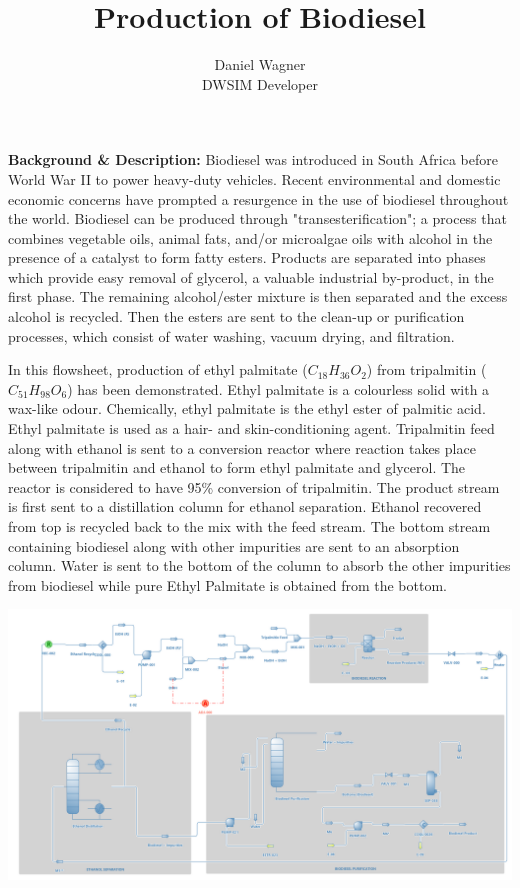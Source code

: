 \documentclass[a4paper,12pt]{article}
\title{Production of Biodiesel}
\author{Daniel Wagner \\ DWSIM Developer}
\date{}
\begin{document}
\maketitle

\noindent \textbf{Background \& Description:}
\newline Biodiesel was introduced in South Africa before World War II to power heavy-duty vehicles. Recent environmental and domestic economic concerns have prompted a resurgence in the use of biodiesel throughout the world. Biodiesel can be produced through "transesterification"; a process that combines vegetable oils, animal fats, and/or microalgae oils with alcohol in the presence of a catalyst to form fatty esters. Products are separated into phases which provide easy removal of glycerol, a valuable industrial by-product, in the first phase. The remaining alcohol/ester mixture is then separated and the excess alcohol is recycled. Then the esters are sent to the clean-up or purification processes, which consist of water washing, vacuum drying, and filtration. 

In this flowsheet, production of ethyl palmitate ($C_{18}H_{36}O_2$) from tripalmitin ($C_{51}H_{98}O_6$) has been demonstrated. Ethyl palmitate is a colourless solid with a wax-like odour. Chemically, ethyl palmitate is the ethyl ester of palmitic acid. Ethyl palmitate is used as a hair- and skin-conditioning agent. Tripalmitin feed along with ethanol is sent to a conversion reactor where reaction takes place between tripalmitin and ethanol to form ethyl palmitate and glycerol. The reactor is considered to have 95\% conversion of tripalmitin. The product stream is first sent to a distillation column for ethanol separation. Ethanol recovered from top is recycled back to the mix with the feed stream. The bottom stream containing biodiesel along with other impurities are sent to an absorption column. Water is sent to the bottom of the column to absorb the other impurities from biodiesel while pure Ethyl Palmitate is obtained from the bottom.

\vspace{7ex}
\centerline{\includegraphics[width=1\linewidth]{Biodiesel-Prod.png}}
\end{document}
